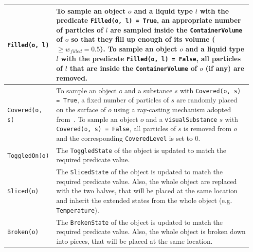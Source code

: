 \begin{table}[!t]
\begin{center}
{\begin{tabular}{ | m{} | m{} | }
\hline
\texttt{Filled(o, l)} & To sample an object $o$ and a liquid type $l$ with the predicate \texttt{Filled(o, l) = True}, an appropriate number of particles of $l$ are sampled inside the \texttt{ContainerVolume} of $o$ so that they fill up enough of its volume ($\geq w_\mathit{filled}=0.5$). To sample an object $o$ and a liquid type $l$ with the predicate \texttt{Filled(o, l) = False}, all particles of $l$ that are inside the \texttt{ContainerVolume} of $o$ (if any) are removed.\\
\hline
\texttt{Covered(o, s)} & To sample an object $o$ and a substance $s$ with \texttt{Covered(o, s) = True}, a fixed number of particles of $s$ are randomly placed on the surface of $o$ using a ray-casting mechanism adopted from~\cite{srivastava2021behavior}. To sample an object $o$  and a \texttt{visualSubstance} $s$ with \texttt{Covered(o, s) = False}, all particles of $s$ is removed from $o$ and the corresponding \texttt{CoveredLevel} is set to 0.\\
\hline
\texttt{ToggledOn(o)} & The \texttt{ToggledState} of the object is updated to match the required predicate value. \\ 
\hline
\texttt{Sliced(o)} & The \texttt{SlicedState} of the object is updated to match the required predicate value. Also, the whole object are replaced with the two halves, that will be placed at the same location and inherit the extended states from the whole object (e.g. \texttt{Temperature}).\\
\hline
\texttt{Broken(o)} & The \texttt{BrokenState} of the object is updated to match the required predicate value. Also, the whole object is broken down into pieces, that will be placed at the same location.\\

\end{tabular}}
\end{center}
\end{table}
